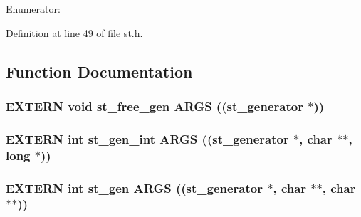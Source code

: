\begin{Desc}
\item[Enumerator: ]\par
\begin{description}
\item[{\em 
ST\_\-CONTINUE\label{st_8h_0c6a172fd99de7928916e65034ed8b1fc99fc55c7f355bf9071739a4bc2ea139}
}]\item[{\em 
ST\_\-STOP\label{st_8h_0c6a172fd99de7928916e65034ed8b1f04b939c166d4baa471909eb224d5fed3}
}]\item[{\em 
ST\_\-DELETE\label{st_8h_0c6a172fd99de7928916e65034ed8b1f64ab176f8e8b9719bcd9b5297ccda9c7}
}]\end{description}
\end{Desc}



Definition at line 49 of file st.h.

\subsection{Function Documentation}
\subsubsection{\setlength{\rightskip}{0pt plus 5cm}EXTERN void st\_\-free\_\-gen ARGS ((\bf{st\_\-generator} $\ast$))}\label{st_8h_a4687431c0bef484ca39111626cc009e}


\subsubsection{\setlength{\rightskip}{0pt plus 5cm}EXTERN int st\_\-gen\_\-int ARGS ((\bf{st\_\-generator} $\ast$, char $\ast$$\ast$, long $\ast$))}\label{st_8h_70637c84dc46fda75e635130e0cf72d5}


\subsubsection{\setlength{\rightskip}{0pt plus 5cm}EXTERN int st\_\-gen ARGS ((\bf{st\_\-generator} $\ast$, char $\ast$$\ast$, char $\ast$$\ast$))}\label{st_8h_fdf81d8d29e72ef4a637d74221fcff1b}


